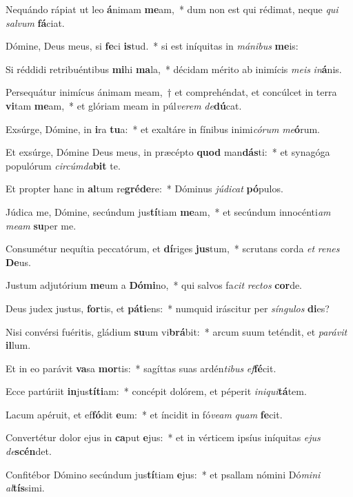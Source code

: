 \item Nequándo rápiat ut leo \textbf{á}nimam \textbf{me}am,~* dum non est qui rédimat, neque \textit{qui} \textit{sal}\textit{vum} \textbf{fá}ciat.
\item Dómine, Deus meus, si \textbf{fe}ci \textbf{is}tud.~* si est iníquitas in \textit{má}\textit{ni}\textit{bus} \textbf{me}is:
\item Si réddidi retribuéntibus \textbf{mi}hi \textbf{ma}la,~* décidam mérito ab inimícis \textit{me}\textit{is} \textit{in}\textbf{á}nis.
\item Persequátur inimícus ánimam meam,~† et comprehéndat, et concúlcet in terra \textbf{vi}tam \textbf{me}am,~* et glóriam meam in púl\textit{ve}\textit{rem} \textit{de}\textbf{dú}cat.
\item Exsúrge, Dómine, in \textbf{i}ra \textbf{tu}a:~* et exaltáre in fínibus inimi\textit{có}\textit{rum} \textit{me}\textbf{ó}rum.
\item Et exsúrge, Dómine Deus meus, in præcépto \textbf{quod} man\textbf{dás}ti:~* et synagóga populórum \textit{cir}\textit{cúm}\textit{da}\textbf{bit} te.
\item Et propter hanc in \textbf{al}tum re\textbf{gré}\textbf{de}re:~* Dóminus \textit{jú}\textit{di}\textit{cat} \textbf{pó}pulos.
\item Júdica me, Dómine, secúndum jus\textbf{tí}tiam \textbf{me}am,~* et secúndum innocénti\textit{am} \textit{me}\textit{am} \textbf{su}per me.
\item Consumétur nequítia peccatórum, et \textbf{dí}riges \textbf{jus}tum,~* scrutans corda \textit{et} \textit{re}\textit{nes} \textbf{De}us.
\item Justum adjutórium \textbf{me}um a \textbf{Dó}\textbf{mi}no,~* qui salvos fa\textit{cit} \textit{rec}\textit{tos} \textbf{cor}de.
\item Deus judex justus, \textbf{for}tis, et \textbf{pá}\textbf{ti}ens:~* numquid iráscitur per \textit{sín}\textit{gu}\textit{los} \textbf{di}es?
\item Nisi convérsi fuéritis, gládium \textbf{su}um vi\textbf{brá}bit:~* arcum suum teténdit, et \textit{pa}\textit{rá}\textit{vit} \textbf{il}lum.
\item Et in eo parávit \textbf{va}sa \textbf{mor}tis:~* sagíttas suas ardén\textit{ti}\textit{bus} \textit{ef}\textbf{fé}cit.
\item Ecce partúriit \textbf{in}jus\textbf{tí}\textbf{ti}am:~* concépit dolórem, et péperit \textit{in}\textit{i}\textit{qui}\textbf{tá}tem.
\item Lacum apéruit, et ef\textbf{fó}dit \textbf{e}um:~* et íncidit in fó\textit{ve}\textit{am} \textit{quam} \textbf{fe}cit.
\item Convertétur dolor ejus in \textbf{ca}put \textbf{e}jus:~* et in vérticem ipsíus iníquitas \textit{e}\textit{jus} \textit{de}\textbf{scén}det.
\item Confitébor Dómino secúndum jus\textbf{tí}tiam \textbf{e}jus:~* et psallam nómini Dó\textit{mi}\textit{ni} \textit{al}\textbf{tís}simi.

